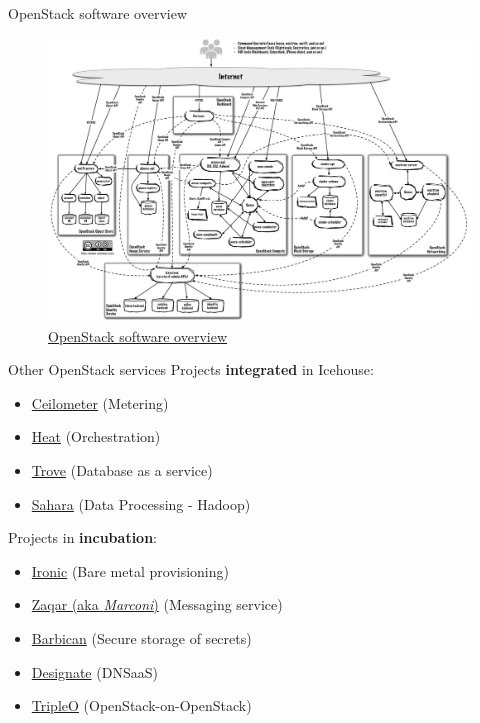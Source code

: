 \documentclass[english,serif,mathserif,usenames,dvipsnames]{beamer}
\begin{document}
\begin{frame}
  {OpenStack software overview}
  \begin{figure}[ht]
    \centering
    \includegraphics[width=\linewidth]{openstack-arch-havana-logical-v1.jpg}
    
  \caption*{\href{http://docs.openstack.org/training-guides/content/figures/5/a/figures/openstack-arch-havana-logical-v1.jpg}{OpenStack software overview}}
\end{figure}
\end{frame}

\begin{frame}
  {Other OpenStack services}
  Projects \textbf{integrated} in Icehouse:
  \begin{itemize}
  \item \href{https://wiki.openstack.org/wiki/Ceilometer}{Ceilometer}
    (Metering)
  \item \href{https://wiki.openstack.org/wiki/Heat}{Heat}
    (Orchestration)
  \item \href{https://wiki.openstack.org/wiki/Trove}{Trove} (Database
    as a service)
  \item \href{https://wiki.openstack.org/wiki/Sahara}{Sahara} (Data
    Processing - Hadoop)
  \end{itemize}

\+
  Projects in \textbf{incubation}:
  \begin{itemize}
  \item \href{https://wiki.openstack.org/wiki/Ironic}{Ironic} (Bare
    metal provisioning)
  \item \href{https://wiki.openstack.org/wiki/Zaqar}{Zaqar (aka
      \textit{Marconi})} (Messaging service)
  \item \href{https://wiki.openstack.org/wiki/Barbican}{Barbican}
    (Secure storage of secrets)
  \item \href{https://wiki.openstack.org/wiki/Designate}{Designate} (DNSaaS)
  \item \href{https://wiki.openstack.org/wiki/TripleO}{TripleO} (OpenStack-on-OpenStack)
  \end{itemize}
\end{frame}
\end{document}
